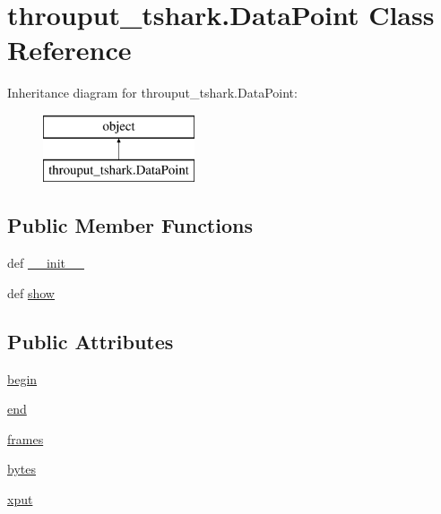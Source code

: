 \hypertarget{classthrouput__tshark_1_1_data_point}{\section{throuput\-\_\-tshark.\-Data\-Point Class Reference}
\label{classthrouput__tshark_1_1_data_point}
}
Inheritance diagram for throuput\-\_\-tshark.\-Data\-Point\-:\begin{figure}[H]
\begin{center}
\leavevmode
\includegraphics[height=2.000000cm]{classthrouput__tshark_1_1_data_point}
\end{center}
\end{figure}
\subsection*{Public Member Functions}
\begin{DoxyCompactItemize}
\item 
def \hyperlink{classthrouput__tshark_1_1_data_point_a47914d6bfeb17b2bf09b7332e6f7ea0e}{\-\_\-\-\_\-init\-\_\-\-\_\-}
\item 
def \hyperlink{classthrouput__tshark_1_1_data_point_abb42b35551c9bfa4a11348d9bf972591}{show}
\end{DoxyCompactItemize}
\subsection*{Public Attributes}
\begin{DoxyCompactItemize}
\item 
\hyperlink{classthrouput__tshark_1_1_data_point_a40bc440085947ec24669e6e5f6c5ddb8}{begin}
\item 
\hyperlink{classthrouput__tshark_1_1_data_point_a04d37b8f30e79e4b8caa963cafb5dd70}{end}
\item 
\hyperlink{classthrouput__tshark_1_1_data_point_a54eab4264d03efb8ec893e85259954c3}{frames}
\item 
\hyperlink{classthrouput__tshark_1_1_data_point_aa9801c08e336468d076ff21e43c817c8}{bytes}
\item 
\hyperlink{classthrouput__tshark_1_1_data_point_aca3722436083ff0c4f619bf32ae2e893}{xput}
\end{DoxyCompactItemize}


